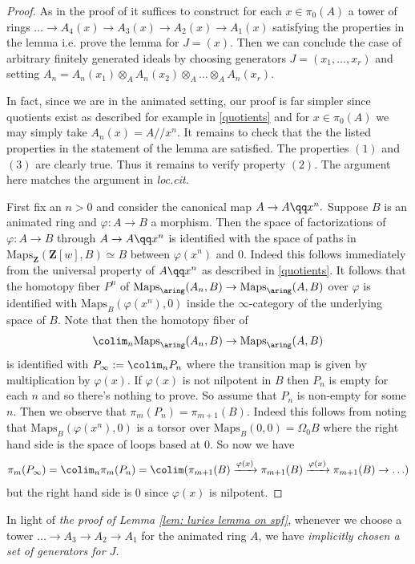 \documentclass[10pt,reqno]{amsart}
\numberwithin{equation}{section}
\newcommand{\ZZ}{\mathbf{Z}}
\newcommand{\Maps}{\mathrm{Maps}}
\begin{document}
\begin{proof}
     As in the proof of \cite[Lemma 8.1.2.2]{Lur18} it suffices to construct for each $x\in \pi_0(A)$ a tower of rings $\ldots \to A_4(x)\to A_3(x)\to A_2(x)\to A_1(x)$ satisfying the properties in the lemma i.e. prove the lemma for $J=(x).$ Then we can conclude the case of arbitrary finitely generated ideals by choosing generators $J=(x_1,\ldots, x_r)$ and setting $A_n=A_n(x_1)\otimes_A A_n(x_2)\otimes_A \ldots \otimes_A A_n(x_r).$

    In fact, since we are in the animated setting, our proof is far simpler since quotients exist as described for example in \ref{quotients} and for $x\in \pi_0(A)$ we may simply take $A_n(x)=A/\!\!/x^n.$ It remains to check that the the listed properties in the statement of the lemma are satisfied. The properties $(1)$ and $(3)$ are clearly true. Thus it remains to verify property $(2).$ The argument here matches the argument in \emph{loc.cit.}

    First fix an $n>0$ and consider the canonical map $A\to A\qq x^n.$  Suppose $B$ is an animated ring and $\varphi\colon A\to B$ a morphism. Then the space of factorizations of $\varphi\colon A\to B$ through $A\to A\qq x^n$ is identified with the space of paths in $\Maps_{\ZZ}(\ZZ[w],B)\simeq B$ between $\varphi(x^n)$ and $0.$ Indeed this follows immediately from the universal property of $A\qq x^n$ as described in \ref{quotients}. It follows that the homotopy fiber $P^n$ of $\Maps_{\aring}(A_n,B)\to \Maps_{\aring}(A,B)$ over $\varphi$ is identified with $\Maps_{B}(\varphi(x^n),0)$ inside the $\infty$-category of the underlying space of $B.$ Note that then the homotopy fiber of $$\colim_n\Maps_{\aring}(A_n,B)\to \Maps_{\aring}(A,B)$$ is identified with $P_\infty:=\colim_n P_n$ where the transition map is given by multiplication by $\varphi(x).$
    If $\varphi(x)$ is not nilpotent in $B$ then $P_n$ is empty for each $n$ and so there's nothing to prove. So assume that $P_n$ is non-empty for some $n$. Then we observe that $\pi_m(P_n)=\pi_{m+1}(B).$ Indeed this follows from noting that $\Maps_{B}(\varphi(x^n),0)$ is a torsor over $\Maps_{B}(0,0)=\Omega_{0}B$ where the right hand side is the space of loops based at $0$.
    So now we have $$\pi_m(P_\infty)=\colim_n\pi_m(P_n)=\colim( \pi_{m+1}(B)\xrightarrow{\varphi(x)} \pi_{m+1}(B)\xrightarrow{\varphi(x)}\pi_{m+1}(B)\to \ldots)$$ but the right hand side is $0$ since $\varphi(x)$ is nilpotent.
\end{proof}

\begin{remark}\label{remark: A_n for animated choose generators}
    In light of \emph{the proof of Lemma \ref{lem: luries lemma on spf}}, whenever we choose a tower $\ldots \to A_3\to A_2\to A_1$ for the animated ring $A$, we have \emph{implicitly chosen a set of generators for $J$}.
\end{remark}
\end{document}
